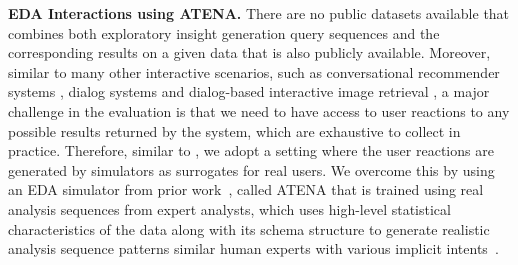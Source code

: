 \noindent\textbf{EDA Interactions using ATENA.}
%
There are no public datasets available that combines both exploratory insight generation query sequences and the corresponding results on a given data that is also publicly available. 
Moreover, similar to many other interactive scenarios, such as conversational recommender systems \cite{christakopoulou2016towards}, dialog systems \cite{shi2019build,takanobu2020multi} and dialog-based interactive image retrieval \cite{guo2018dialog,yu2019visual}, a major challenge in the evaluation is that we need to have access to user reactions to any possible results returned by the system, which are exhaustive to collect in practice. Therefore, similar to \cite{christakopoulou2016towards,guo2018dialog,yu2019visual,shi2019build}, we adopt a setting where the user reactions are generated by simulators as surrogates for real users.
We overcome this by using an EDA simulator from prior work~\cite{atena2020sigmod}, called ATENA that is trained using real analysis sequences from expert analysts, which uses high-level statistical characteristics 
of the data along with its schema structure 
to generate realistic analysis sequence patterns similar human experts with various implicit intents~\cite{atena2020sigmod}.
%
%
